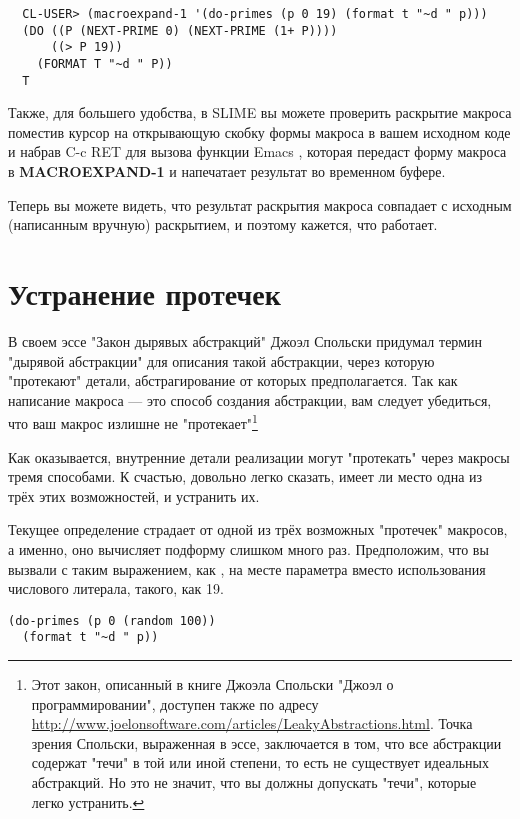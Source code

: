 \begin{verbatim}
  CL-USER> (macroexpand-1 '(do-primes (p 0 19) (format t "~d " p)))
  (DO ((P (NEXT-PRIME 0) (NEXT-PRIME (1+ P))))
      ((> P 19))
    (FORMAT T "~d " P))
  T
\end{verbatim}

Также, для большего удобства, в SLIME вы можете проверить раскрытие макроса поместив
курсор на открывающую скобку формы макроса в вашем исходном коде и набрав C-c RET для
вызова функции Emacs , которая передаст форму макроса в
\textbf{MACROEXPAND-1} и напечатает результат во временном буфере.

Теперь вы можете видеть, что результат раскрытия макроса совпадает с исходным (написанным
вручную) раскрытием, и поэтому кажется, что  работает.

\section{Устранение протечек}

В своем эссе "Закон дырявых абстракций" Джоэл Спольски придумал термин "дырявой
абстракции" для описания такой абстракции, через которую "протекают" детали,
абстрагирование от которых предполагается. Так как написание макроса --- это способ
создания абстракции, вам следует убедиться, что ваш макрос излишне не
"протекает"\footnote{Этот закон, описанный в книге Джоэла Спольски "Джоэл о
  программировании", доступен также по адресу
  \url{http://www.joelonsoftware.com/articles/LeakyAbstractions.html}. Точка зрения
  Спольски, выраженная в эссе, заключается в том, что все абстракции содержат "течи" в той
  или иной степени, то есть не существует идеальных абстракций. Но это не значит, что вы
  должны допускать "течи", которые легко устранить.}

Как оказывается, внутренние детали реализации могут "протекать" через макросы тремя
способами. К счастью, довольно легко сказать, имеет ли место одна из трёх этих
возможностей, и устранить их.

Текущее определение страдает от одной из трёх возможных "протечек" макросов, а именно, оно
вычисляет подформу  слишком много раз. Предположим, что вы вызвали
 с таким выражением, как , на месте параметра
 вместо использования числового литерала, такого, как 19.

\begin{lstlisting}
(do-primes (p 0 (random 100))
  (format t "~d " p))
\end{lstlisting}

